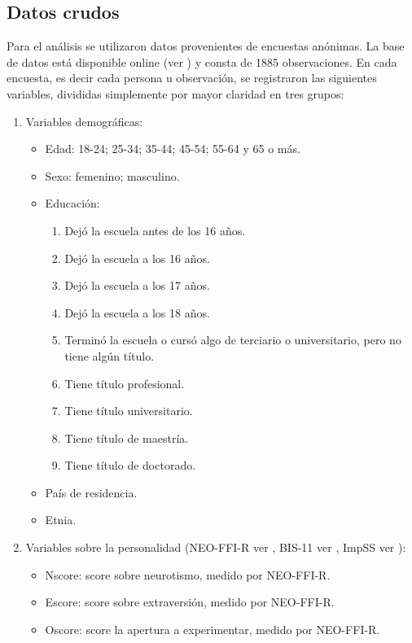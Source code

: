 \documentclass[a4paper,twocolumn]{article}
\begin{document}
\subsection{Datos crudos}
Para el análisis se utilizaron datos provenientes de encuestas anónimas. La base de datos está disponible online (ver \cite{dataset}) y consta de 1885 observaciones. En cada encuesta, es decir cada persona u observación, se registraron las siguientes variables, divididas simplemente por mayor claridad en tres grupos:
\begin{enumerate}[label=\roman*)]
	\item Variables demográficas:
	\begin{itemize}%
		\item Edad: 18-24; 25-34; 35-44; 45-54; 55-64 y 65 o más.
		\item Sexo: femenino; masculino.
		\item Educación:
		\begin{enumerate}[label=\arabic*)]
			\item Dejó la escuela antes de los 16 años.
			\item Dejó la escuela a los 16 años.
			\item Dejó la escuela a los 17 años.
			\item Dejó la escuela a los 18 años.
			\item Terminó la escuela o cursó algo de terciario o universitario, pero no tiene algún título.
			\item Tiene título profesional.
			\item Tiene título universitario.
			\item Tiene título de maestría.
			\item Tiene título de doctorado.
		\end{enumerate}
		\item País de residencia.
		\item Etnia.
	\end{itemize}
	\item Variables sobre la personalidad (\mbox{NEO-FFI-R} ver \cite{neoffir}, BIS-11 ver \cite{bis11}, ImpSS ver \cite{impss}):
	\begin{itemize}%
		\item Nscore: score sobre neurotismo, medido por \mbox{NEO-FFI-R}.
		\item Escore: score sobre extraversión, medido por \mbox{NEO-FFI-R}.
		\item Oscore: score la apertura a experimentar, medido por \mbox{NEO-FFI-R}.

\end{itemize}
\end{enumerate}
\end{document}
